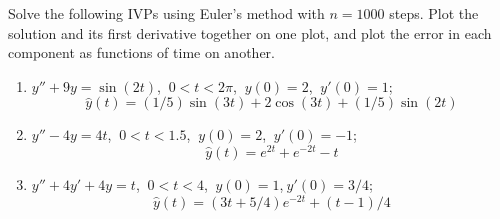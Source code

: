 \begin{exercise}
	Solve the following IVPs using Euler's method with $n=1000$ steps. Plot the
	solution and its first derivative together on one plot, and plot the error in
	each component as functions of time on another.
	\begin{enumerate}
		\item $y''+ 9y = \sin(2t)$, $\ 0< t< 2\pi$, $\ y(0) = 2$, $\ y'(0) = 1$; \\
		      \[
			      \hat{y}(t) = (1/5) \sin(3t) + 2 \cos (3t)+  (1/5) \sin (2t)
		      \]
		\item $y''- 4y = 4t$, $\: 0< t< 1.5$, $\: y(0) = 2$, $\: y'(0) = -1$; \\
		      \[
			      \hat{y}(t) = e^{2t} + e^{-2t}-t
		      \]
		\item $y''+ 4y'+ 4y = t$, $\: 0< t< 4$, $\: y(0) = 1$,$\: y'(0) = 3/4$; \\
		      \[
			      \hat{y}(t) = (3t+5/4)e^{-2t} + (t-1)/4
		      \]
	\end{enumerate}
\end{exercise}

